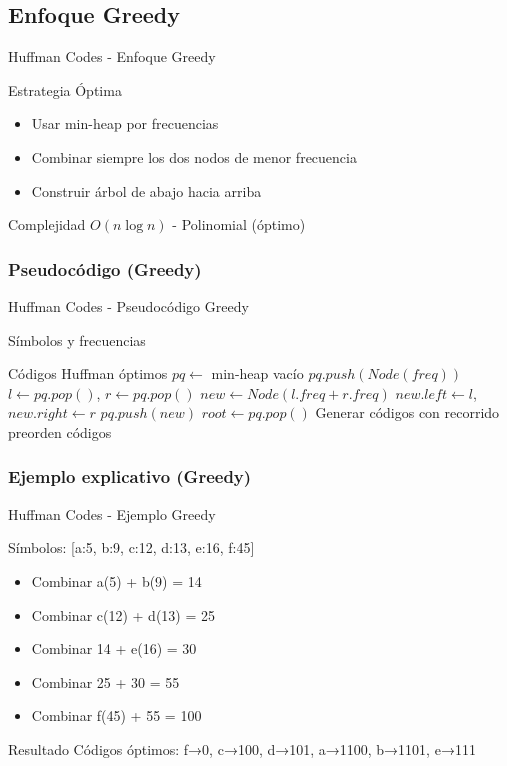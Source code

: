\documentclass[aspectratio=169]{beamer}
\renewcommand{\algorithmicrequire}{\textbf{Entrada:}}
\renewcommand{\algorithmicensure}{\textbf{Salida:}}
\newcommand{\REQUIRE}{\item[\algorithmicrequire]}
\newcommand{\ENSURE}{\item[\algorithmicensure]}
\begin{document}
\subsection{Enfoque Greedy}
\begin{frame}{Huffman Codes - Enfoque Greedy}
\begin{block}{Estrategia Óptima}
\begin{itemize}
\item Usar min-heap por frecuencias
\item Combinar siempre los dos nodos de menor frecuencia
\item Construir árbol de abajo hacia arriba
\end{itemize}
\end{block}

\begin{alertblock}{Complejidad}
$O(n \log n)$ - Polinomial (óptimo)
\end{alertblock}
\end{frame}

\subsubsection{Pseudocódigo (Greedy)}
\begin{frame}[fragile]{Huffman Codes - Pseudocódigo Greedy}
\begin{algorithmic}[1]
\REQUIRE Símbolos y frecuencias
\ENSURE Códigos Huffman óptimos
\State $pq \leftarrow$ min-heap vacío
    \State $pq.push(Node(freq))$
\EndFor
{}
    \State $l \leftarrow pq.pop()$, $r \leftarrow pq.pop()$
    \State $new \leftarrow Node(l.freq + r.freq)$
    \State $new.left \leftarrow l$, $new.right \leftarrow r$
    \State $pq.push(new)$
\EndWhile
\State $root \leftarrow pq.pop()$
\State Generar códigos con recorrido preorden
\Return códigos
\end{algorithmic}
\end{frame}

\subsubsection{Ejemplo explicativo (Greedy)}
\begin{frame}{Huffman Codes - Ejemplo Greedy}
\begin{exampleblock}{Símbolos: [a:5, b:9, c:12, d:13, e:16, f:45]}
\begin{itemize}
\item Combinar a(5) + b(9) = 14
\item Combinar c(12) + d(13) = 25
\item Combinar 14 + e(16) = 30
\item Combinar 25 + 30 = 55
\item Combinar f(45) + 55 = 100
\end{itemize}
\end{exampleblock}

\begin{block}{Resultado}
Códigos óptimos: f→0, c→100, d→101, a→1100, b→1101, e→111
\end{block}
\end{frame}
\end{document}
